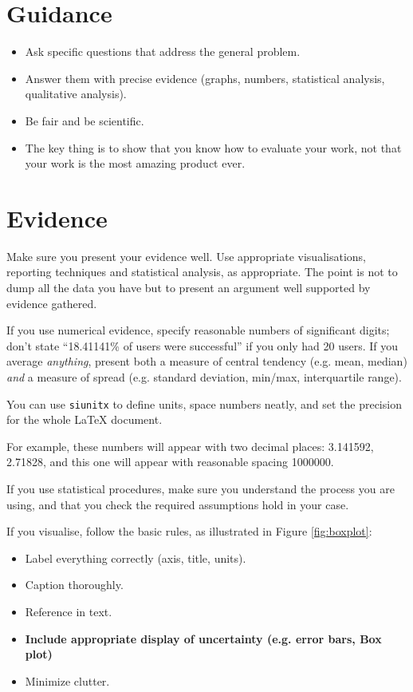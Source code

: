 \documentclass{l4proj}
\begin{document}
\section{Guidance}
\begin{itemize}
    \item
        Ask specific questions that address the general problem.
    \item
        Answer them with precise evidence (graphs, numbers, statistical
        analysis, qualitative analysis).
    \item
        Be fair and be scientific.
    \item
        The key thing is to show that you know how to evaluate your work, not
        that your work is the most amazing product ever.
\end{itemize}

\section{Evidence}
Make sure you present your evidence well. Use appropriate visualisations, 
reporting techniques and statistical analysis, as appropriate. The point is not
to dump all the data you have but to present an argument well supported by evidence gathered.

If you use numerical evidence, specify reasonable numbers of significant digits; don't state ``18.41141\% of users were successful'' if you only had 20 users. If you average \textit{anything}, present both a measure of central tendency (e.g. mean, median) \textit{and} a measure of spread (e.g. standard deviation, min/max, interquartile range).

You can use \texttt{siunitx} to define units, space numbers neatly, and set the precision for the whole LaTeX document. 


For example, these numbers will appear with two decimal places: \num{3.141592}, \num{2.71828}, and this one will appear with reasonable spacing \num{1000000}.



If you use statistical procedures, make sure you understand the process you are using,
and that you check the required assumptions hold in your case. 

If you visualise, follow the basic rules, as illustrated in Figure \ref{fig:boxplot}:
\begin{itemize}
\item Label everything correctly (axis, title, units).
\item Caption thoroughly.
\item Reference in text.
\item \textbf{Include appropriate display of uncertainty (e.g. error bars, Box plot)}
\item Minimize clutter.
\end{itemize}
\end{document}

